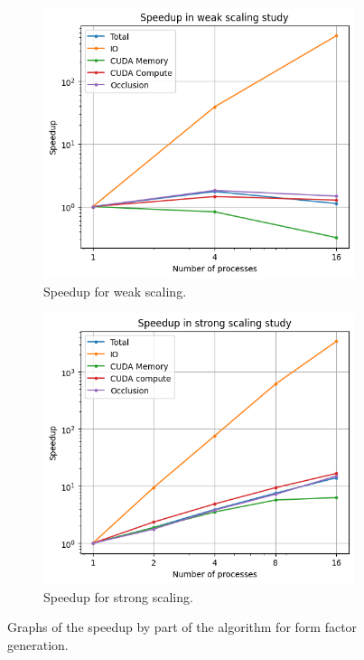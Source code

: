 \documentclass[conference]{IEEEtran}
\begin{document}
\begin{figure}
\begin{subfigure}{.49\textwidth}
\includegraphics[width=\columnwidth]{weak_new.png}
\caption{Speedup for weak scaling.}
\label{fig:weakgraph_speedup}
\end{subfigure}
\hspace{0.01\textwidth}
\begin{subfigure}{.49\textwidth}
\includegraphics[width=\columnwidth]{strong_new.png}
\caption{Speedup for strong scaling.}
\label{fig:stronggraph_speedup}
\end{subfigure}
\caption{Graphs of the speedup by part of the algorithm for form factor generation.}
\end{figure}
\end{document}
